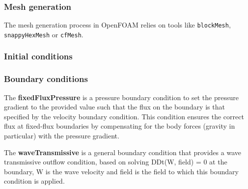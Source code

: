 \documentclass[12pt]{article}
\begin{document}
\begin{table}[H]
\centering
\caption{Comparison of OpenFOAM Solvers for Compressible Flow Simulations}
\label{tab:openfoam_solvers}
\end{table}

\subsubsection*{Mesh generation}
The mesh generation process in OpenFOAM relies on tools like \texttt{blockMesh}, \texttt{snappyHexMesh} or  \texttt{cfMesh}.

\subsubsection*{Initial conditions}

\subsubsection*{Boundary conditions}
The \textbf{fixedFluxPressure} is a pressure boundary condition to set the pressure gradient to the provided value such that the flux on the boundary is that specified by the velocity boundary condition. This condition ensures the correct flux at fixed-flux boundaries by compensating for the body forces (gravity in particular) with the pressure gradient.

The \textbf{waveTransmissive} is a general boundary condition that provides a wave transmissive outflow condition, based on solving DDt(W, field) = 0 at the boundary, W is the wave velocity and field is the field to which this boundary condition is applied.
\end{document}
